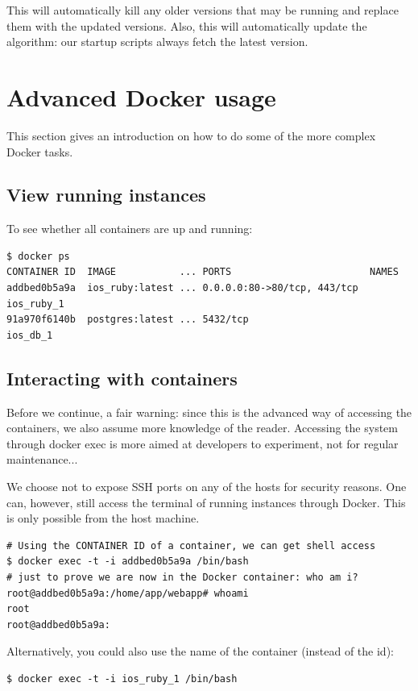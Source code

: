 This will automatically kill any older versions that may be running and replace them with the updated versions. Also, this will automatically update the algorithm: our startup scripts always fetch the latest version.

\section{Advanced Docker usage}
This section gives an introduction on how to do some of the more complex Docker tasks.

\subsection{View running instances}
To see whether all containers are up and running:
\begin{verbatim}
$ docker ps
CONTAINER ID  IMAGE           ... PORTS                        NAMES
addbed0b5a9a  ios_ruby:latest ... 0.0.0.0:80->80/tcp, 443/tcp  ios_ruby_1          
91a970f6140b  postgres:latest ... 5432/tcp                     ios_db_1
\end{verbatim}

\subsection{Interacting with containers}
Before we continue, a fair warning: since this is the advanced way of accessing the containers, we also assume more knowledge of the reader. Accessing the system through docker exec is more aimed at developers to experiment, not for regular maintenance...

We choose not to expose SSH ports on any of the hosts for security reasons. One can, however, still access the terminal of running instances through Docker. This is only possible from the host machine. 

\begin{verbatim}
# Using the CONTAINER ID of a container, we can get shell access
$ docker exec -t -i addbed0b5a9a /bin/bash
# just to prove we are now in the Docker container: who am i?
root@addbed0b5a9a:/home/app/webapp# whoami
root
root@addbed0b5a9a:
\end{verbatim}

Alternatively, you could also use the name of the container (instead of the id):
\begin{verbatim}
$ docker exec -t -i ios_ruby_1 /bin/bash
\end{verbatim}

